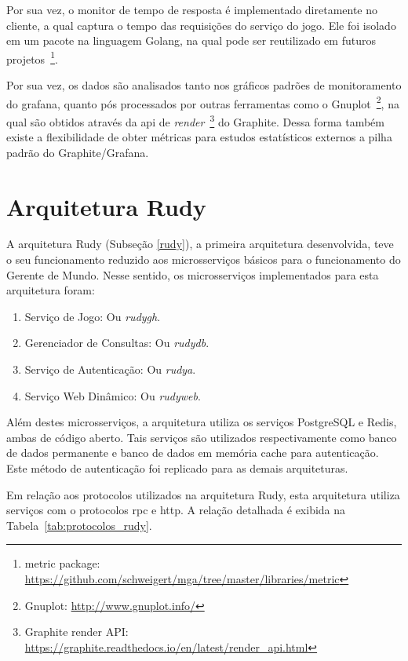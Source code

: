 Por sua vez, o monitor de tempo de resposta é implementado diretamente no cliente, a qual captura o tempo das requisições do serviço do jogo.
%
Ele foi isolado em um pacote na linguagem Golang, na qual pode ser reutilizado em futuros projetos~\footnote{metric package: \url{https://github.com/schweigert/mga/tree/master/libraries/metric}}.

Por sua vez, os dados são analisados tanto nos gráficos padrões de monitoramento do grafana, quanto pós processados por outras ferramentas como o Gnuplot~\footnote{Gnuplot: \url{http://www.gnuplot.info/}}, na qual são obtidos através da \ac{api} de \textit{render}~\footnote{Graphite render API: \url{https://graphite.readthedocs.io/en/latest/render_api.html}} do Graphite.
%
Dessa forma também existe a flexibilidade de obter métricas para estudos estatísticos externos a pilha padrão do Graphite/Grafana.



\section{Arquitetura Rudy}
\label{sec:arc_rudy}

A arquitetura Rudy (Subseção \ref{rudy}), a primeira arquitetura desenvolvida, teve o seu funcionamento reduzido aos microsserviços básicos para o funcionamento do Gerente de Mundo.
%
Nesse sentido, os microsserviços implementados para esta arquitetura foram:

\begin{enumerate}
    \item Serviço de Jogo: Ou \textit{rudygh}.
    \item Gerenciador de Consultas: Ou \textit{rudydb}.
    \item Serviço de Autenticação: Ou \textit{rudya}.
    \item Serviço Web Dinâmico: Ou \textit{rudyweb}.
\end{enumerate}



Além destes microsserviços, a arquitetura utiliza os serviços PostgreSQL e Redis, ambas de código aberto.
%
Tais serviços são utilizados respectivamente como banco de dados permanente e banco de dados em memória cache para autenticação.
%
Este método de autenticação foi replicado para as demais arquiteturas.

Em relação aos protocolos utilizados na arquitetura Rudy, esta arquitetura utiliza serviços com o protocolos \ac{rpc} e \ac{http}.
%
A relação detalhada é exibida na Tabela~\ref{tab:protocolos_rudy}.



